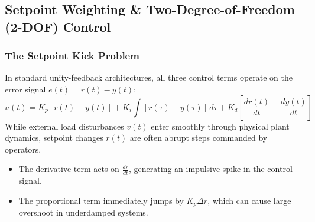 \documentclass[12pt,onecolumn,twoside ]{article}
\begin{document}
	\subsection{Setpoint Weighting \& Two-Degree-of-Freedom (2-DOF) Control}
	\subsubsection{The Setpoint Kick Problem}
	In standard unity-feedback architectures, all three control terms operate on the error signal $e(t) = r(t) - y(t)$: \[
	u(t) = K_p [r(t) - y(t)] + K_i \int [r(\tau) - y(\tau)]\, d\tau + K_d \left[ \frac{dr(t)}{dt} - \frac{dy(t)}{dt} \right]
	\] While external load disturbances $v(t)$ enter smoothly through physical plant dynamics, setpoint changes $r(t)$ are often abrupt steps commanded by operators.
	\begin{itemize}
		\item
		The derivative term acts on $\frac{dr}{dt}$, generating an impulsive spike in the control signal.
		\item
		The proportional term immediately jumps by $K_p \Delta r$, which can cause large overshoot in underdamped systems.
	\end{itemize}
	
\end{document}
